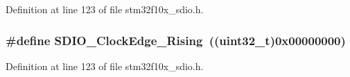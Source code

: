 Definition at line 123 of file stm32f10x\+\_\+sdio.\+h.

\subsubsection[{\texorpdfstring{S\+D\+I\+O\+\_\+\+Clock\+Edge\+\_\+\+Rising}{SDIO_ClockEdge_Rising}}]{\setlength{\rightskip}{0pt plus 5cm}\#define S\+D\+I\+O\+\_\+\+Clock\+Edge\+\_\+\+Rising~(({\bf uint32\+\_\+t})0x00000000)}\hypertarget{group___s_d_i_o___clock___edge_ga6d0f902037762a3048d95303c0037313}{}\label{group___s_d_i_o___clock___edge_ga6d0f902037762a3048d95303c0037313}


Definition at line 123 of file stm32f10x\+\_\+sdio.\+h.


